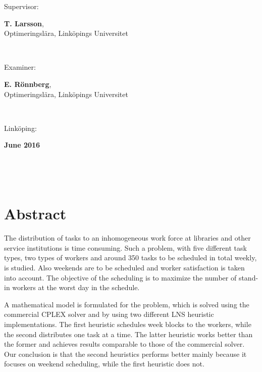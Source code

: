 \documentclass[a4paper, 10pt, twoside, openright]{book}
\newcommand{\putabstract}[0]{%
The distribution of tasks to an inhomogeneous work force at libraries and other service institutions is time consuming. Such a problem, with five different task types, two types of workers and around 350 tasks to be scheduled in total weekly, is studied. Also weekends are to be scheduled and worker satisfaction is taken into account. The objective of the scheduling is to maximize the number of stand-in workers at the worst day in the schedule.

A mathematical model is formulated for the problem, which is solved using the commercial CPLEX solver and by using two different LNS heuristic implementations. The first heuristic schedules week blocks to the workers, while the second distributes one task at a time. The latter heuristic works better than the former and achieves results comparable to those of the commercial solver. Our conclusion is that the second heuristics performs better mainly because it focuses on weekend scheduling, while the first heuristic does not.}
\newcommand{\putthemonth}[0]{June }
\newcommand{\putshortdate}[0]{2016}
\newcommand{\putmydate}[0]{\putthemonth \putshortdate}
\newcommand{\putexaminer}[0]{E. Rönnberg}
\newcommand{\putsupervisor}[0]{T. Larsson}
\newcommand{\putdepartment}[0]{Optimeringslära}
\newcommand{\putliu}[0]{Linköpings Universitet}
\begin{document}
{\begin{minipage}{150mm}
                Supervisor:\hspace*{3pt}
                \begin{minipage}[t]{120mm}
                  \textbf{\putsupervisor}, \\\putdepartment, \putliu
                \end{minipage} \\ \vspace*{4mm}
                
                Examiner:\hspace*{3pt}
                \begin{minipage}[t]{120mm}
                  \textbf{\putexaminer}, \\\putdepartment, \putliu
                \end{minipage} \\ \vspace*{4mm}
                
                Linköping:
                \begin{minipage}[t]{70mm}
                  \textbf{\putmydate}
                \end{minipage} \\ \vspace*{4mm}
              \end{minipage} \\ \hfill
}

\maketitle

\phantom{crap}
\thispagestyle{empty}
\pagestyle{empty}

\setlength{\unitlength}{1mm}


\setlength{\unitlength}{1pt}

\pagestyle{fancy}

\chapter*{Abstract}
\putabstract
\end{document}
